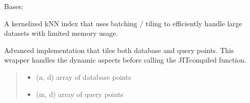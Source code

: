 \documentclass[letterpaper,10pt,english]{sphinxmanual}
\begin{document}
\begin{fulllineitems}
\label{\detokenize{api_reference:id36}}
\pysigstartsignatures
{}
\pysigstopsignatures
\sphinxAtStartPar
Bases: 

\sphinxAtStartPar
A kernelized kNN index that uses batching / tiling to efficiently handle
large datasets with limited memory usage.

\begin{fulllineitems}
\label{\detokenize{api_reference:id37}}
\pysigstartsignatures
{}
\pysigstopsignatures
\end{fulllineitems}


\begin{fulllineitems}
\label{\detokenize{api_reference:id38}}
\pysigstartsignatures
{}
\pysigstopsignatures
\sphinxAtStartPar
Advanced implementation that tiles both database and query points.
This wrapper handles the dynamic aspects before calling the JIT\sphinxhyphen{}compiled
function.
\begin{quote}\begin{description}
\begin{itemize}
\item {} 
\sphinxAtStartPar
{} \textendash{} (n, d) array of database points

\item {} 
\sphinxAtStartPar
{} \textendash{} (m, d) array of query points


\end{itemize}
\end{description}
\end{quote}
\end{fulllineitems}
\end{fulllineitems}
\end{document}
